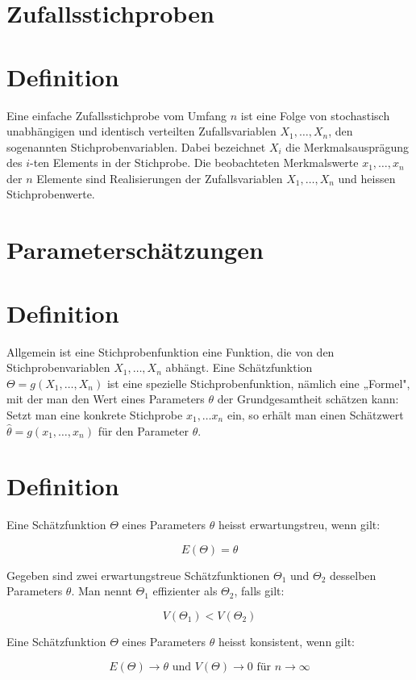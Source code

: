 \documentclass[10pt]{article}
\begin{document}
\section*{Zufallsstichproben}
\section*{Definition}
Eine einfache Zufallsstichprobe vom Umfang $n$ ist eine Folge von stochastisch unabhängigen und identisch verteilten Zufallsvariablen $X_{1}, \ldots, X_{n}$, den sogenannten Stichprobenvariablen. Dabei bezeichnet $X_{i}$ die Merkmalsausprägung des $i$-ten Elements in der Stichprobe. Die beobachteten Merkmalswerte $x_{1}, \ldots, x_{n}$ der $n$ Elemente sind Realisierungen der Zufallsvariablen $X_{1}, \ldots, X_{n}$ und heissen Stichprobenwerte.

\section*{Parameterschätzungen}
\section*{Definition}
Allgemein ist eine Stichprobenfunktion eine Funktion, die von den Stichprobenvariablen $X_{1}, \ldots, X_{n}$ abhängt. Eine Schätzfunktion $\Theta=g\left(X_{1}, \ldots, X_{n}\right)$ ist eine spezielle Stichprobenfunktion, nämlich eine „Formel", mit der man den Wert eines Parameters $\theta$ der Grundgesamtheit schätzen kann: Setzt man eine konkrete Stichprobe $x_{1}, \ldots x_{n}$ ein, so erhält man einen Schätzwert $\hat{\theta}=g\left(x_{1}, \ldots, x_{n}\right)$ für den Parameter $\theta$.

\section*{Definition}
Eine Schätzfunktion $\Theta$ eines Parameters $\theta$ heisst erwartungstreu, wenn gilt:

$$
E(\Theta)=\theta
$$

Gegeben sind zwei erwartungstreue Schätzfunktionen $\Theta_{1}$ und $\Theta_{2}$ desselben Parameters $\theta$. Man nennt $\Theta_{1}$ effizienter als $\Theta_{2}$, falls gilt:

$$
V\left(\Theta_{1}\right)<V\left(\Theta_{2}\right)
$$

Eine Schätzfunktion $\Theta$ eines Parameters $\theta$ heisst konsistent, wenn gilt:

$$
E(\Theta) \rightarrow \theta \text { und } V(\Theta) \rightarrow 0 \text { für } n \rightarrow \infty
$$
\end{document}
